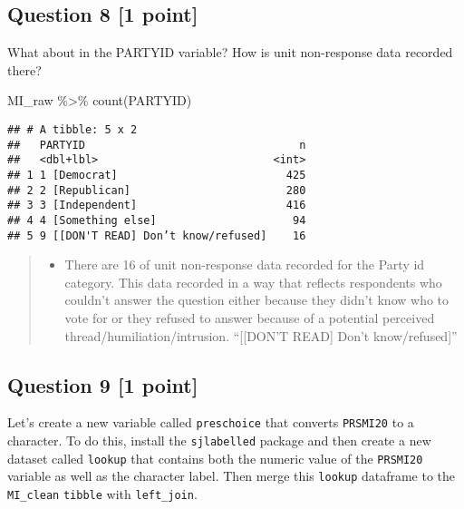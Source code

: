 \documentclass[
]{article}
\newenvironment{Shaded}{\begin{snugshade}}{\end{snugshade}}
\newcommand{\FunctionTok}[1]{\textcolor[rgb]{0.00,0.00,0.00}{#1}}
\newcommand{\NormalTok}[1]{#1}
\newcommand{\SpecialCharTok}[1]{\textcolor[rgb]{0.00,0.00,0.00}{#1}}
\providecommand{\tightlist}{%
  \setlength{\itemsep}{0pt}\setlength{\parskip}{0pt}}
\begin{document}
\hypertarget{question-8-1-point}{%
\subsection{Question 8 {[}1 point{]}}\label{question-8-1-point}}

What about in the PARTYID variable? How is unit non-response data
recorded there?

\begin{Shaded}
\begin{Highlighting}[]
\NormalTok{MI\_raw }\SpecialCharTok{\%\textgreater{}\%}
  \FunctionTok{count}\NormalTok{(PARTYID)}
\end{Highlighting}
\end{Shaded}

\begin{verbatim}
## # A tibble: 5 x 2
##   PARTYID                                 n
##   <dbl+lbl>                           <int>
## 1 1 [Democrat]                          425
## 2 2 [Republican]                        280
## 3 3 [Independent]                       416
## 4 4 [Something else]                     94
## 5 9 [[DON'T READ] Don’t know/refused]    16
\end{verbatim}

\begin{quote}
\begin{itemize}
\tightlist
\item
  There are 16 of unit non-response data recorded for the Party id
  category. This data recorded in a way that reflects respondents who
  couldn't answer the question either because they didn't know who to
  vote for or they refused to answer because of a potential perceived
  thread/humiliation/intrusion. ``{[}{[}DON'T READ{]} Don't
  know/refused{]}''
\end{itemize}
\end{quote}

\hypertarget{question-9-1-point}{%
\subsection{Question 9 {[}1 point{]}}\label{question-9-1-point}}

Let's create a new variable called \texttt{preschoice} that converts
\texttt{PRSMI20} to a character. To do this, install the
\texttt{sjlabelled} package and then create a new dataset called
\texttt{lookup} that contains both the numeric value of the
\texttt{PRSMI20} variable as well as the character label. Then merge
this \texttt{lookup} dataframe to the \texttt{MI\_clean} \texttt{tibble}
with \texttt{left\_join}.
\end{document}
